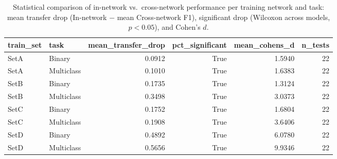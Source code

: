 \begin{table}
\caption{Statistical comparison of in-network vs.\ cross-network performance per training network and task: mean transfer drop (In-network $-$ mean Cross-network F1), significant drop (Wilcoxon across models, $p<0.05$), and Cohen's $d$.}
\label{tab:q3_stats}
\begin{tabular}{llrrrr}
\toprule
train_set & task & mean_transfer_drop & pct_significant & mean_cohens_d & n_tests \\
\midrule
SetA & Binary & 0.0912 & True & 1.5940 & 22 \\
SetA & Multiclass & 0.1010 & True & 1.6383 & 22 \\
SetB & Binary & 0.1735 & True & 1.3124 & 22 \\
SetB & Multiclass & 0.3498 & True & 3.0373 & 22 \\
SetC & Binary & 0.1752 & True & 1.6804 & 22 \\
SetC & Multiclass & 0.1908 & True & 3.6406 & 22 \\
SetD & Binary & 0.4892 & True & 6.0780 & 22 \\
SetD & Multiclass & 0.5656 & True & 9.9346 & 22 \\
\bottomrule
\end{tabular}
\end{table}
